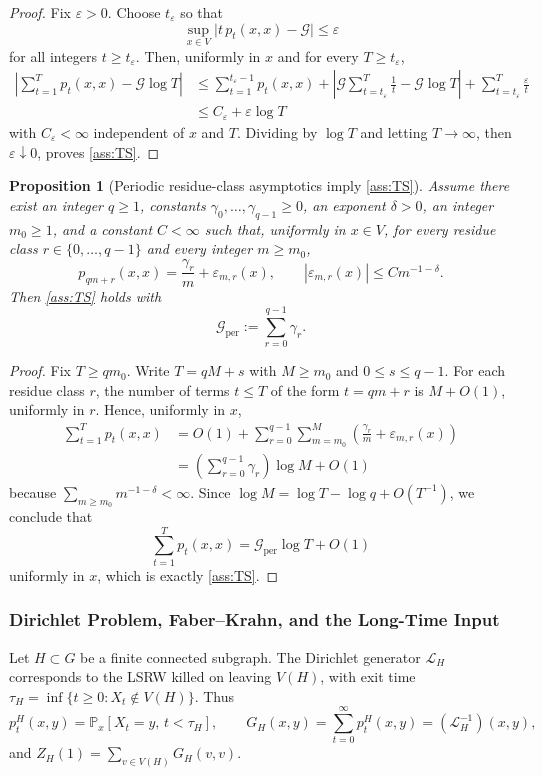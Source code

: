 \documentclass[reqno]{amsart}
\numberwithin{equation}{section}
\newtheorem{proposition}[proposition]{Proposition}
\theoremstyle{definition}
\theoremstyle{remark}
\newcommand{\Cref}[1]{\autoref{#1}}
\newcommand{\cG}{\mathcal{G}}
\newcommand{\LL}{\mathcal{L}}
\newcommand{\Prob}{\mathbb{P}}
\begin{document}
\begin{proof}
Fix $\varepsilon>0$. Choose $t_\varepsilon$ so that
\[
  \sup_{x\in V}\bigl|t\,p_t(x,x)-\cG\bigr|\le \varepsilon
\]
for all integers $t\ge t_\varepsilon$. Then, uniformly in $x$ and for every $T\ge t_\varepsilon$,
\begin{align*}
\left|\sum_{t=1}^{T} p_t(x,x)-\cG \log T\right|
&\le \sum_{t=1}^{t_\varepsilon-1} p_t(x,x)
   + \left|\cG \sum_{t=t_\varepsilon}^{T}\frac1t-\cG\log T\right|
   + \sum_{t=t_\varepsilon}^{T}\frac{\varepsilon}{t} \\
&\le C_\varepsilon + \varepsilon \log T
\end{align*}
with $C_\varepsilon<\infty$ independent of $x$ and $T$. Dividing by $\log T$ and letting $T\to\infty$, then $\varepsilon\downarrow0$, proves \Cref{ass:TS}.
\end{proof}

\begin{proposition}[Periodic residue-class asymptotics imply \Cref{ass:TS}]\label{prop:periodic_TS}
Assume there exist an integer $q\ge 1$, constants $\gamma_0,\dots,\gamma_{q-1}\ge 0$, an exponent $\delta>0$, an integer $m_0\ge 1$, and a constant $C<\infty$ such that, uniformly in $x\in V$, for every residue class $r\in\{0,\dots,q-1\}$ and every integer $m\ge m_0$,
\[
  p_{qm+r}(x,x)=\frac{\gamma_r}{m}+\varepsilon_{m,r}(x),
  \qquad |\varepsilon_{m,r}(x)|\le C m^{-1-\delta}.
\]
Then \Cref{ass:TS} holds with
\[
  \cG_{\mathrm{per}}:=\sum_{r=0}^{q-1}\gamma_r.
\]
\end{proposition}

\begin{proof}
Fix $T\ge q m_0$. Write $T=qM+s$ with $M\ge m_0$ and $0\le s\le q-1$. For each residue class $r$, the number of terms $t\le T$ of the form $t=qm+r$ is $M+O(1)$, uniformly in $r$. Hence, uniformly in $x$,
\begin{align*}
\sum_{t=1}^{T} p_t(x,x)
&= O(1)+\sum_{r=0}^{q-1}\sum_{m=m_0}^{M}
\left(\frac{\gamma_r}{m}+\varepsilon_{m,r}(x)\right) \\
&= \left(\sum_{r=0}^{q-1}\gamma_r\right)\log M + O(1)
\end{align*}
because $\sum_{m\ge m_0} m^{-1-\delta}<\infty$. Since $\log M=\log T-\log q+O(T^{-1})$, we conclude that
\[
  \sum_{t=1}^{T} p_t(x,x)=\cG_{\mathrm{per}}\log T+O(1)
\]
uniformly in $x$, which is exactly \Cref{ass:TS}.
\end{proof}



\subsubsection{Dirichlet Problem, Faber--Krahn, and the Long-Time Input}
Let $H \subset G$ be a finite connected subgraph. The Dirichlet generator $\LL_H$ corresponds to the LSRW killed on leaving $V(H)$, with exit time $\tau_H = \inf\{t \geq 0 : X_t \notin V(H)\}$. Thus
\[
  p_t^H(x,y) = \Prob_x[X_t = y,\, t < \tau_H],\qquad
  G_H(x,y) = \sum_{t=0}^{\infty} p_t^H(x,y) = (\LL_H^{-1})(x,y),
\]
and $Z_H(1) = \sum_{v \in V(H)} G_H(v,v)$.
\end{document}
